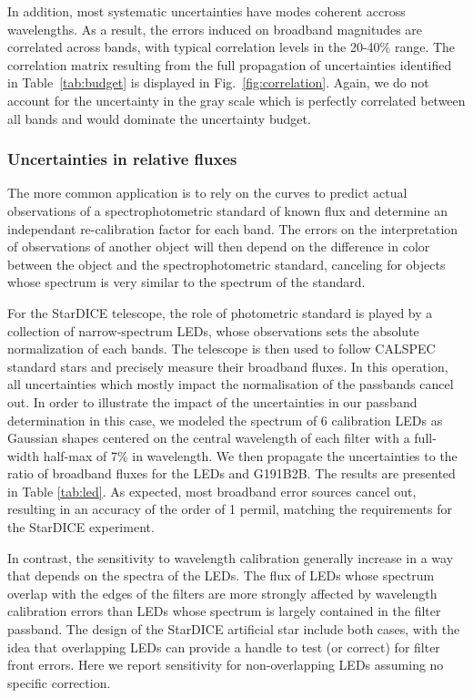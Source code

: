 In addition, most systematic uncertainties have modes coherent accross
wavelengths. As a result, the errors induced on broadband magnitudes
are correlated across bands, with typical correlation levels in the
20-40\% range. The correlation matrix resulting from the full
propagation of uncertainties identified in Table~\ref{tab:budget} is
displayed in Fig.~\ref{fig:correlation}. Again, we do not account for
the uncertainty in the gray scale which is perfectly correlated
between all bands and would dominate the uncertainty budget.

\subsubsection{Uncertainties in relative fluxes}
\label{sec:relative}

The more common application is to rely on the curves to predict actual
observations of a spectrophotometric standard of known flux and
determine an independant re-calibration factor for each band. The
errors on the interpretation of observations of another object will
then depend on the difference in color between the object and the
spectrophotometric standard, canceling for objects whose spectrum is
very similar to the spectrum of the standard.

For the StarDICE telescope, the role of photometric standard is played
by a collection of narrow-spectrum LEDs, whose observations sets the
absolute normalization of each bands. The telescope is then used to
follow CALSPEC standard stars and precisely measure their broadband
fluxes. In this operation, all uncertainties which mostly impact the
normalisation of the passbands cancel out. In order to illustrate the
impact of the uncertainties in our passband determination in this
case, we modeled the spectrum of 6 calibration LEDs as Gaussian shapes
centered on the central wavelength of each filter with a full-width
half-max of 7\% in wavelength. We then propagate the uncertainties to
the ratio of broadband fluxes for the LEDs and G191B2B. The results
are presented in Table \ref{tab:led}. As expected, most broadband
error sources cancel out, resulting in an accuracy of the order of 1
permil, matching the requirements for the StarDICE experiment.

In contrast, the sensitivity to wavelength calibration generally
increase in a way that depends on the spectra of the LEDs. The flux of
LEDs whose spectrum overlap with the edges of the filters are more
strongly affected by wavelength calibration errors than LEDs whose
spectrum is largely contained in the filter passband. The design of
the StarDICE artificial star include both cases, with the idea that
overlapping LEDs can provide a handle to test (or correct) for filter
front errors. Here we report sensitivity for non-overlapping LEDs
assuming no specific correction.

